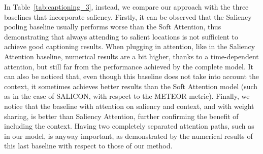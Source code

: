 In Table~\ref{tab:captioning_3}, instead, we compare our approach with the three baselines that incorporate saliency. Firstly, it can be observed that the Saliency pooling baseline usually performs worse than the Soft Attention, thus demonstrating that always attending to salient locations is not sufficient to achieve good captioning results. When plugging in attention, like in the Saliency Attention baseline, numerical results are a bit higher, thanks to a time-dependent attention, but still far from the performance achieved by the complete model. It can also be noticed that, even though this baseline does not take into account the context, it sometimes achieves better results than the Soft Attention model (such as in the case of SALICON, with respect to the METEOR metric). Finally, we notice that the baseline with attention on saliency and context, and with weight sharing, is better than Saliency Attention, further confirming the benefit of including the context. Having two completely separated attention paths, such as in our model, is anyway important, as demonstrated by the numerical results of this last baseline with respect to those of our method.

